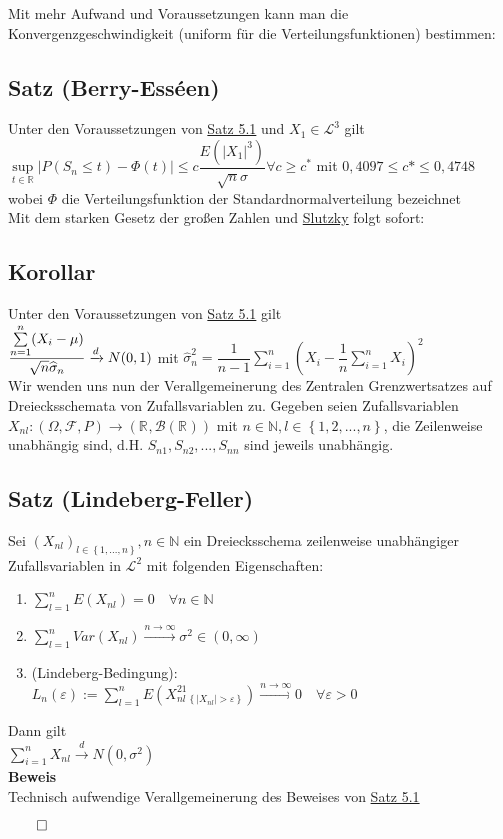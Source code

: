 \documentclass[german,10pt,oneside, fleqn, a4paper]{article}
\newcommand {\R}	{\mathbb{R}}
\newcommand {\N}	{\mathbb{N}}
\newcommand{\ra}{\rightarrow}
\newcommand{\sm}[2][\infty]{\sum\limits_{#2}^{#1}}
\newcommand{\brc}[1]{\left(#1\right)}
\newcommand{\brac}[1]{\left\lbrace #1\right\rbrace}
\newcommand{\QED}{\begin{flushright}$\qed$\end{flushright}}
\newcommand{\mc}[1]{\mathcal{#1}}
\newcommand{\lp}[1]{\mc{L}^{#1}}
\newcommand{\beweis}{\textbf{Beweis}\\}
\newcommand{\toinf}{\rightarrow\infty}
\newcommand{\1}[1]{1_{#1}}
\newcommand{\2}[1]{\1{\brac{#1}}}
\newcommand{\xr}[2][]{\xrightarrow[#1]{#2}}
\newcommand{\rbor}[1][d]{\brc{\R^{#1},\mc{B}\brc{\R^{#1}}}}
\newcommand{\raum}{\brc{\Omega,\mc{F},P}}
\newcommand{\fe}{\forall\varepsilon>0}
\newcommand{\nn}{n\in\N}
\begin{document}
Mit mehr Aufwand und Voraussetzungen kann man die Konvergenzgeschwindigkeit (uniform für die  Verteilungsfunktionen) bestimmen:

\subsection{Satz (Berry-Esséen)}
\label{5.2}
Unter den Voraussetzungen von \hyperref[5.1]{Satz 5.1} und $X_1\in\lp{3}$ gilt\\
$\sup\limits_{t\in\R}|P(S_n\leq t)-\Phi(t)|\leq c\dfrac{E(|X_1|^3)}{\sqrt{n}\sigma}\forall c\geq c^*$ mit $0,4097\leq c*\leq 0,4748$ wobei $\Phi$ die Verteilungsfunktion der Standardnormalverteilung bezeichnet\\
Mit dem starken Gesetz der großen Zahlen und \hyperref[3.12]{Slutzky} folgt sofort:

\subsection{Korollar}
\label{5.3}
Unter den Voraussetzungen von \hyperref[5.1]{Satz 5.1} gilt\\
$\dfrac{\sm[n]{n=1}(X_i-\mu)}{\sqrt{n}\widehat{\sigma}_n}\xr{d}N(0,1)\\ $
mit $\widehat{\sigma}_n^2=\dfrac{1}{n-1}\sm[n]{i=1}\brc{X_i-\dfrac{1}{n}\sm[n]{i=1}X_i}^2$\\
Wir wenden uns nun der Verallgemeinerung des Zentralen Grenzwertsatzes auf Dreiecksschemata von Zufallsvariablen zu. Gegeben seien Zufallsvariablen $X_{nl}:\raum\ra\rbor[]$ mit $\nn ,l\in\brac{1,2,...,n}$, die Zeilenweise unabhängig sind, d.H. $S_{n1},S_{n2},...,S_{nn}$ sind jeweils unabhängig.

\subsection{Satz (Lindeberg-Feller)}
\label{5.4}
Sei $\brc{X_{nl}}_{l\in\brac{1,...,n}},\nn$ ein Dreiecksschema zeilenweise unabhängiger Zufallsvariablen in $\lp{2}$ mit folgenden Eigenschaften:\begin{enumerate}[label=(\alph*)]
\item $ \sm[n]{l=1}E(X_{nl})=0\quad \forall\nn $
\item $ \sm[n]{l=1}Var(X_{nl})\xr{n\toinf}\sigma^2\in(0,\infty)$
\item (Lindeberg-Bedingung):\\
$L_n(\varepsilon):=\sm[n]{l=1}E\brc{X_{nl}^2\1{\brac{|X_{nl}|>\varepsilon}}}\xr{n\toinf}0\quad \fe $
\end{enumerate}
Dann gilt \\
$\sm[n]{i=1}X_{nl}\xr{d}N(0,\sigma^2)$\\
\beweis
Technisch aufwendige Verallgemeinerung des Beweises von \hyperref[5.1]{Satz 5.1}\QED
\end{document}

